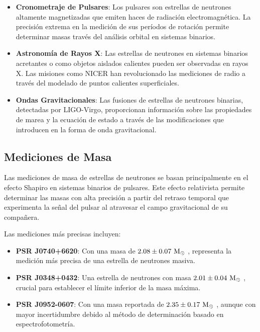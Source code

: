 \begin{itemize}
	\item \textbf{Cronometraje de Pulsares}: Los pulsares son estrellas de neutrones altamente magnetizadas que emiten haces de radiación electromagnética. La precisión extrema en la medición de sus períodos de rotación permite determinar masas través del análisis orbital en sistemas binarios.
	
	\item \textbf{Astronomía de Rayos X}: Las estrellas de neutrones en sistemas binarios acretantes o como objetos aislados calientes pueden ser observadas en rayos X. Las misiones como NICER han revolucionado las mediciones de radio a través del modelado de puntos calientes superficiales.
	
	\item \textbf{Ondas Gravitacionales}: Las fusiones de estrellas de neutrones binarias, detectadas por LIGO-Virgo, proporcionan información sobre las propiedades de marea y la ecuación de estado a través de las modificaciones que introducen en la forma de onda gravitacional.
\end{itemize}

\subsection{Mediciones de Masa}

Las mediciones de masa de estrellas de neutrones se basan principalmente en el efecto Shapiro en sistemas binarios de pulsares. Este efecto relativista permite determinar las masas con alta precisión a partir del retraso temporal que experimenta la señal del pulsar al atravesar el campo gravitacional de su compañera.

Las mediciones más precisas incluyen:

\begin{itemize}
	\item \textbf{PSR J0740+6620}: Con una masa de $2.08 \pm 0.07 \, \,\text{M}_\odot$ \cite{fonsecaRefinedMassGeometric2021}, representa la medición más precisa de una estrella de neutrones masiva.
	
	\item \textbf{PSR J0348+0432}: Una estrella de neutrones con masa $2.01 \pm 0.04 \, \,\text{M}_\odot$ \cite{antoniadisMassivePulsarCompact2013}, crucial para establecer el límite inferior de la masa máxima.
	
	\item \textbf{PSR J0952-0607}: Con una masa reportada de $2.35 \pm 0.17 \, \,\text{M}_\odot$ \cite{romaniPSRJ09520607Fastest2022}, aunque con mayor incertidumbre debido al método de determinación basado en espectrofotometría.
\end{itemize}

